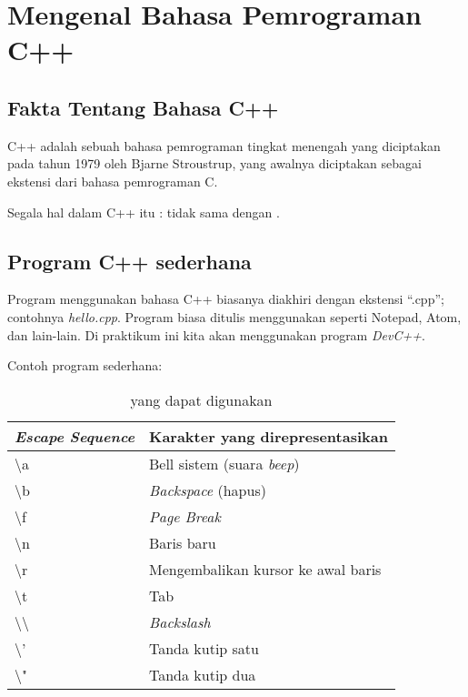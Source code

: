 \documentclass[../main.tex]{subfiles}
\begin{document}
\chapter{Mengenal Bahasa Pemrograman C++}
\section{Fakta Tentang Bahasa C++}
C++ adalah sebuah bahasa pemrograman tingkat menengah yang diciptakan pada tahun
1979 oleh Bjarne Stroustrup, yang awalnya diciptakan sebagai ekstensi dari
bahasa pemrograman C.

Segala hal dalam C++ itu :  tidak sama
dengan .

\section{Program C++ sederhana}
Program menggunakan bahasa C++ biasanya diakhiri dengan ekstensi \enquote{.cpp};
contohnya \emph{hello.cpp}. Program biasa ditulis menggunakan 
seperti Notepad, Atom, dan lain-lain. Di praktikum ini kita akan menggunakan
program \emph{DevC++}.

Contoh program sederhana:

\begin{table}
\centering
\begin{tabular}{@{} l l @{}}
  \toprule
  \emph{Escape Sequence}  & Karakter yang direpresentasikan  \\
  \midrule
  \textbackslash{}a    & Bell sistem (suara \emph{beep})\\
  \textbackslash{}b    & \emph{Backspace} (hapus)\\
  \textbackslash{}f    & \emph{Page Break}\\
  \textbackslash{}n    & Baris baru\\
  \textbackslash{}r    & Mengembalikan kursor ke awal baris\\
  \textbackslash{}t    & Tab\\
  \textbackslash{}\textbackslash{}    & \emph{Backslash}\\
  \textbackslash{}'    & Tanda kutip satu\\
  \textbackslash{}"    & Tanda kutip dua\\
  \bottomrule
\end{tabular}
\caption{ yang dapat digunakan}
\label{tipe-escape}
\end{table}
\end{document}
